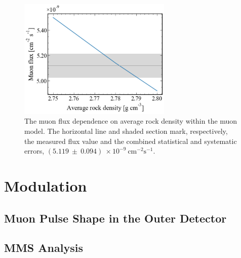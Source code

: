\begin{figure}[htbp]
    \centering
    \includegraphics[width=0.65\textwidth]{figures/Muons/Flux_density_ws22_ws24.pdf}
    \caption{The muon flux dependence on average rock density within the muon model. The horizontal line and shaded section mark, respectively, the measured flux value and the combined statistical and systematic errors, $(5.119~\pm~0.094)~\times10^{-9}~\textrm{cm}^{-2}\textrm{s}^{-1}$.}
    \label{fig:flux_density}
\end{figure}


\section{Modulation}
\subsection{Muon Pulse Shape in the Outer Detector}
\subsection{MMS Analysis}